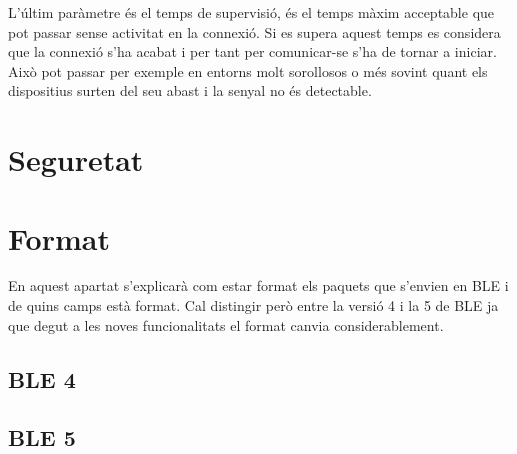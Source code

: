 L'últim paràmetre és el temps de supervisió, és el temps màxim acceptable que pot passar sense activitat en la connexió.
Si es supera aquest temps es considera que la connexió s'ha acabat i per tant per comunicar-se s'ha de tornar a iniciar.
Això pot passar per exemple en entorns molt sorollosos o més sovint quant els dispositius surten del seu abast i la senyal no és detectable.

\section{Seguretat}

\section{Format}
En aquest apartat s'explicarà com estar format els paquets que s'envien en BLE i de quins camps està format.
Cal distingir però entre la versió 4 i la 5 de BLE ja que degut a les noves funcionalitats el format canvia considerablement.

\subsection{BLE 4}
\subsection{BLE 5}